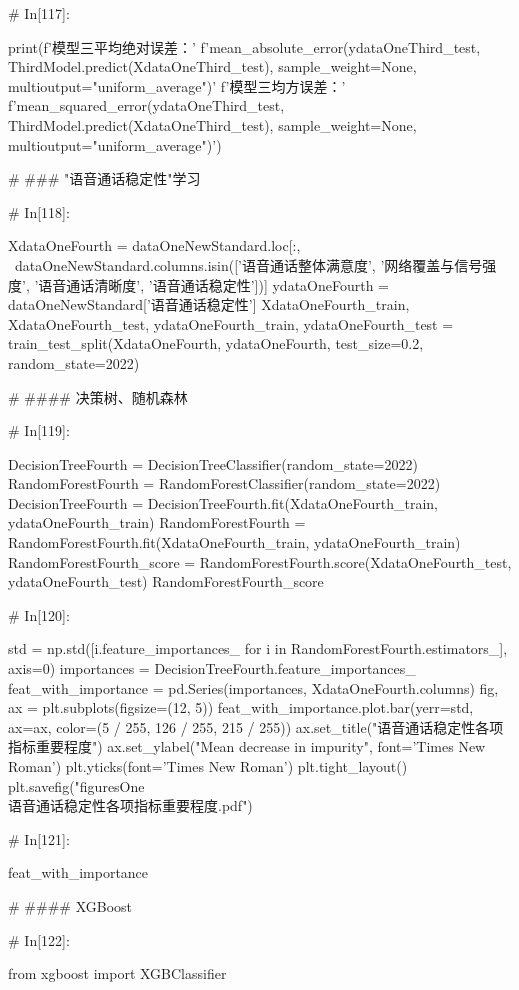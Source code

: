 \documentclass{MathorCupmodeling}
\begin{document}
\begin{python}
	# In[117]:
	
	
	print(f'模型三平均绝对误差：'
		  f'{mean_absolute_error(ydataOneThird_test, ThirdModel.predict(XdataOneThird_test), sample_weight=None, multioutput="uniform_average")}\n'
		  f'模型三均方误差：'
		  f'{mean_squared_error(ydataOneThird_test, ThirdModel.predict(XdataOneThird_test), sample_weight=None, multioutput="uniform_average")}')
	
	# ### "语音通话稳定性"学习
	
	# In[118]:
	
	
	XdataOneFourth = dataOneNewStandard.loc[:, ~dataOneNewStandard.columns.isin(['语音通话整体满意度', '网络覆盖与信号强度', '语音通话清晰度', '语音通话稳定性'])]
	ydataOneFourth = dataOneNewStandard['语音通话稳定性']
	XdataOneFourth_train, XdataOneFourth_test, ydataOneFourth_train, ydataOneFourth_test = train_test_split(XdataOneFourth, ydataOneFourth, test_size=0.2, random_state=2022)
	
	# #### 决策树、随机森林
	
	# In[119]:
	
	
	DecisionTreeFourth = DecisionTreeClassifier(random_state=2022)
	RandomForestFourth = RandomForestClassifier(random_state=2022)
	DecisionTreeFourth = DecisionTreeFourth.fit(XdataOneFourth_train, ydataOneFourth_train)
	RandomForestFourth = RandomForestFourth.fit(XdataOneFourth_train, ydataOneFourth_train)
	RandomForestFourth_score = RandomForestFourth.score(XdataOneFourth_test, ydataOneFourth_test)
	RandomForestFourth_score
	
	# In[120]:
	
	
	std = np.std([i.feature_importances_ for i in RandomForestFourth.estimators_], axis=0)
	importances = DecisionTreeFourth.feature_importances_
	feat_with_importance = pd.Series(importances, XdataOneFourth.columns)
	fig, ax = plt.subplots(figsize=(12, 5))
	feat_with_importance.plot.bar(yerr=std, ax=ax, color=(5 / 255, 126 / 255, 215 / 255))
	ax.set_title("语音通话稳定性各项指标重要程度")
	ax.set_ylabel("Mean decrease in impurity", font='Times New Roman')
	plt.yticks(font='Times New Roman')
	plt.tight_layout()
	plt.savefig("figuresOne\\[附件1]语音通话稳定性各项指标重要程度.pdf")
	
	# In[121]:
	
	
	feat_with_importance
	
	# #### XGBoost
	
	# In[122]:
	
	
	from xgboost import XGBClassifier
	

\end{python}
\end{document}
